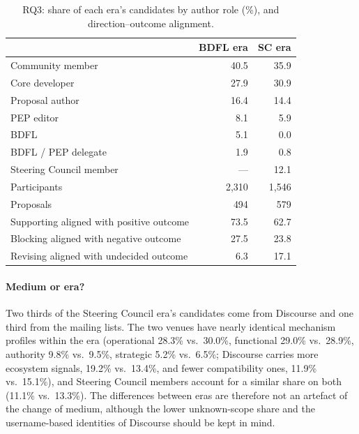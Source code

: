 
\begin{table}[t]
\caption{RQ3: share of each era's candidates by author role (\%), and direction--outcome alignment.}
\label{tab:rq3roles}
\begin{tabular}{lrr}
\toprule
 & BDFL era & SC era \\
\midrule
Community member & 40.5 & 35.9 \\
Core developer & 27.9 & 30.9 \\
Proposal author & 16.4 & 14.4 \\
PEP editor & 8.1 & 5.9 \\
BDFL & 5.1 & 0.0 \\
BDFL / PEP delegate & 1.9 & 0.8 \\
Steering Council member & --- & 12.1 \\
\midrule
Participants & 2,310 & 1,546 \\
Proposals & 494 & 579 \\
Supporting aligned with positive outcome & 73.5 & 62.7 \\
Blocking aligned with negative outcome & 27.5 & 23.8 \\
Revising aligned with undecided outcome & 6.3 & 17.1 \\
\bottomrule
\end{tabular}
\end{table}

\paragraph{Medium or era?} Two thirds of the Steering Council era's candidates come from Discourse and one third from the mailing lists. The two venues have nearly identical mechanism profiles within the era (operational 28.3\% vs.\ 30.0\%, functional 29.0\% vs.\ 28.9\%, authority 9.8\% vs.\ 9.5\%, strategic 5.2\% vs.\ 6.5\%; Discourse carries more ecosystem signals, 19.2\% vs.\ 13.4\%, and fewer compatibility ones, 11.9\% vs.\ 15.1\%), and Steering Council members account for a similar share on both (11.1\% vs.\ 13.3\%). The differences between eras are therefore not an artefact of the change of medium, although the lower unknown-scope share and the username-based identities of Discourse should be kept in mind.
